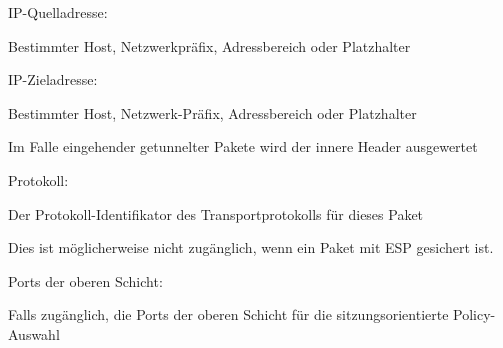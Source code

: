 \documentclass[a4paper]{article}
\begin{document}
\begin{multicols}{3}
      \begin{itemize*}
            \item IP-Quelladresse:
            \begin{itemize*}
                  \item Bestimmter Host, Netzwerkpräfix, Adressbereich oder Platzhalter
            \end{itemize*}
            \item IP-Zieladresse:
            \begin{itemize*}
                  \item Bestimmter Host, Netzwerk-Präfix, Adressbereich oder Platzhalter
                  \item Im Falle eingehender getunnelter Pakete wird der innere Header ausgewertet
            \end{itemize*}
            \item Protokoll:
            \begin{itemize*}
                  \item Der Protokoll-Identifikator des Transportprotokolls für dieses Paket
                  \item Dies ist möglicherweise nicht zugänglich, wenn ein Paket mit ESP gesichert ist.
            \end{itemize*}
            \item Ports der oberen Schicht:
            \begin{itemize*}
                  \item Falls zugänglich, die Ports der oberen Schicht für die sitzungsorientierte Policy-Auswahl
            \end{itemize*}
      \end{itemize*}



\end{multicols}
\end{document}
